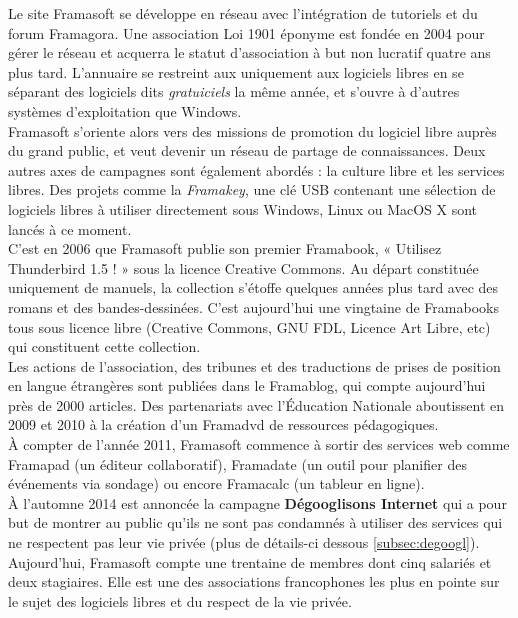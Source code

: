 \documentclass[10pt,a4paper, twoside]{report}
\begin{document}
	Le site Framasoft se développe en réseau avec l'intégration de tutoriels et du forum Framagora. Une association Loi 1901 éponyme est fondée en 2004 pour gérer le réseau et acquerra le statut d'association à but non lucratif quatre ans plus tard. L'annuaire se restreint aux uniquement aux logiciels libres en se séparant des logiciels dits \textit{gratuiciels} la même année, et s'ouvre à d'autres systèmes d'exploitation que Windows.
	\\
	
	Framasoft s'oriente alors vers des missions de promotion du logiciel libre auprès du grand public, et veut devenir un réseau de partage de connaissances. Deux autres axes de campagnes sont également abordés : la culture libre et les services libres. Des projets comme la \textit{Framakey}, une clé USB contenant une sélection de logiciels libres à utiliser directement sous Windows, Linux ou MacOS X sont lancés à ce moment.
	\\
	
	C'est en 2006 que Framasoft publie son premier Framabook, « Utilisez Thunderbird 1.5 ! » sous la licence Creative Commons. Au départ constituée uniquement de manuels, la collection s'étoffe quelques années plus tard avec des romans et des bandes-dessinées. C'est aujourd'hui une vingtaine de Framabooks tous sous licence libre (Creative Commons, GNU FDL, Licence Art Libre, etc) qui constituent cette collection.
	\\
	
	Les actions de l'association, des tribunes et des traductions de prises de position en langue étrangères sont publiées dans le Framablog, qui compte aujourd'hui près de 2000 articles. Des partenariats avec l'Éducation Nationale aboutissent en 2009 et 2010 à la création d'un Framadvd de ressources pédagogiques.
	\\
	
	À compter de l'année 2011, Framasoft commence à sortir des services web comme Framapad (un éditeur collaboratif), Framadate (un outil pour planifier des événements via sondage) ou encore Framacalc (un tableur en ligne).
	\\
	
	À l'automne 2014 est annoncée la campagne \textbf{Dégooglisons Internet} qui a pour but de montrer au public qu'ils ne sont pas condamnés à utiliser des services qui ne respectent pas leur vie privée (plus de détails-ci dessous \ref{subsec:degoogl}).
	\\
	
	Aujourd'hui, Framasoft compte une trentaine de membres dont cinq salariés et deux stagiaires. Elle est une des associations francophones les plus en pointe sur le sujet des logiciels libres et du respect de la vie privée.
	\\
	
\end{document}
